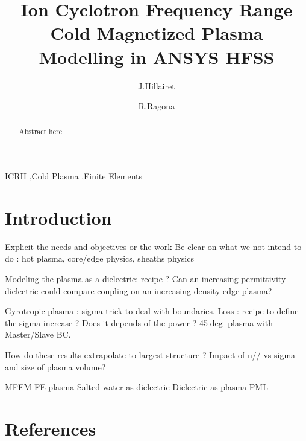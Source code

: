\documentclass[review]{elsarticle}
\begin{document}
\begin{frontmatter}

\title{Ion Cyclotron Frequency Range Cold Magnetized Plasma Modelling in {ANSYS} {HFSS}}
\author[IRFM]{J.Hillairet}
\author[ERM]{R.Ragona}


\address[IRFM]{CEA, IRFM, F-13108 Saint Paul-lez-Durance, France}
\address[ERM]{Laboratory for Plasma Physics, Royal Military Academy, (LPP-ERM/KMS), BE-1000, Brussels, Belgium}


\begin{abstract}
Abstract here
\end{abstract}

\begin{keyword}
ICRH \sep Cold Plasma \sep Finite Elements
\end{keyword}

\end{frontmatter}

\linenumbers

\section{Introduction}


Explicit the needs and objectives or the work
Be clear on what we not intend to do : hot plasma, core/edge physics, sheaths physics

Modeling the plasma as a dielectric: recipe ? Can an increasing permittivity dielectric could compare  coupling on an increasing density edge plasma? 

Gyrotropic plasma : sigma trick to deal with boundaries.
Loss : recipe to define the sigma increase ? Does it depends of the power ?
45$\deg$ plasma with Master/Slave BC. 



How do these results extrapolate to largest structure ? Impact of n// vs sigma and size of plasma volume? 

MFEM FE plasma \cite{Shiraiwa2017}
Salted water as dielectric \cite{Ravera2012, Bottollier-Curtet2011}
Dielectric as plasma \cite{Messiaen2011}
PML \cite{Becache2016}

\section*{References}


\end{document}
